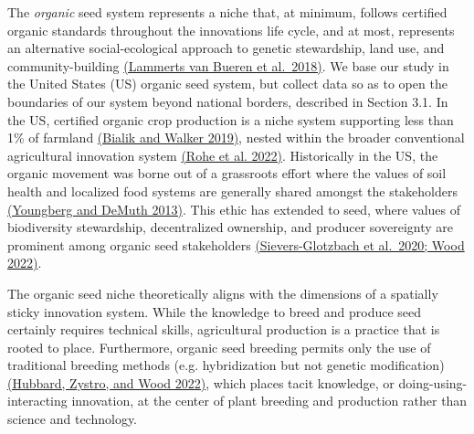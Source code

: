 \documentclass[twoside,12pt,final]{ucthesis-CA2012}
\begin{document}
\begin{ucmainmatter}
The \emph{organic} seed system represents a niche that, at minimum, follows
certified organic standards throughout the innovation\textquotesingle s life cycle, and
at most, represents an alternative social-ecological approach to genetic
stewardship, land use, and community-building \href{https://www.zotero.org/google-docs/?M7oLtN}{(Lammerts van Bueren et
al.~2018)}. We base our
study in the United States (US) organic seed system, but collect data so
as to open the boundaries of our system beyond national borders,
described in Section 3.1. In the US, certified organic crop production
is a niche system supporting less than 1\% of farmland \href{https://www.zotero.org/google-docs/?MUDaIX}{(Bialik and
Walker 2019)}, nested within
the broader conventional agricultural innovation system \href{https://www.zotero.org/google-docs/?bC3bUx}{(Rohe et al.
2022)}. Historically in the
US, the organic movement was borne out of a grassroots effort where the
values of soil health and localized food systems are generally shared
amongst the stakeholders \href{https://www.zotero.org/google-docs/?crrP2S}{(Youngberg and DeMuth
2013)}. This ethic has
extended to seed, where values of biodiversity stewardship,
decentralized ownership, and producer sovereignty are prominent among
organic seed stakeholders \href{https://www.zotero.org/google-docs/?vRXqid}{(Sievers-Glotzbach et al.~2020; Wood
2022)}.

The organic seed niche theoretically aligns with the dimensions of a
spatially sticky innovation system. While the knowledge to breed and
produce seed certainly requires technical skills, agricultural
production is a practice that is rooted to place. Furthermore, organic
seed breeding permits only the use of traditional breeding methods (e.g.
hybridization but not genetic modification) \href{https://www.zotero.org/google-docs/?taRcUw}{(Hubbard, Zystro, and Wood
2022)}, which places tacit
knowledge, or \textquotesingle doing-using-interacting\textquotesingle{} innovation, at the center of
plant breeding and production rather than science and technology.


\end{ucmainmatter}
\end{document}
